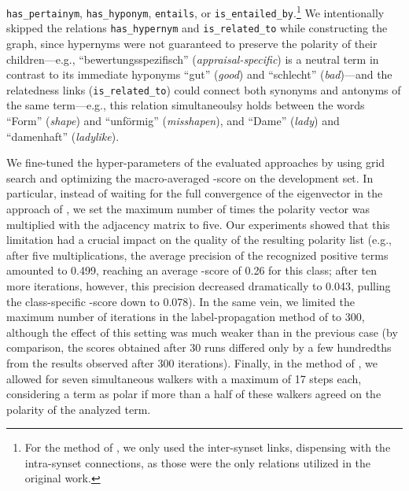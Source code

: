 \texttt{has\_pertainym}, \texttt{has\_hyponym}, \texttt{entails}, or
\texttt{is\_entailed\_by}.\footnote{For the method of
  \citet{Esuli:06c}, we only used the inter-synset links, dispensing
  with the intra-synset connections, as those were the only relations
  utilized in the original work.} We intentionally skipped the
relations \texttt{has\_hypernym} and \texttt{is\_related\_to} while
constructing the graph, since hypernyms were not guaranteed to
preserve the polarity of their children---e.g.,
``bewertungsspezifisch'' (\emph{appraisal-specific}) is a neutral term
in contrast to its immediate hyponyms ``gut'' (\emph{good}) and
``schlecht'' (\emph{bad})---and the relatedness links
(\texttt{is\_related\_to}) could connect both synonyms and antonyms of
the same term---e.g., this relation simultaneoulsy holds between the
words ``Form'' (\emph{shape}) and ``unf\"ormig'' (\emph{misshapen}),
and ``Dame'' (\emph{lady}) and ``damenhaft'' (\emph{ladylike}).

We fine-tuned the hyper-parameters of the evaluated approaches by
using grid search and optimizing the macro-averaged \F{}-score on the
development set.  In particular, instead of waiting for the full
convergence of the eigenvector in the approach of
\citet{Blair-Goldensohn:08}, we set the maximum number of times the
polarity vector was multiplied with the adjacency matrix to five.  Our
experiments showed that this limitation had a crucial impact on the
quality of the resulting polarity list (e.g., after five
multiplications, the average precision of the recognized positive
terms amounted to 0.499, reaching an average \F{}-score of 0.26 for
this class; after ten more iterations, however, this precision
decreased dramatically to 0.043, pulling the class-specific \F{}-score
down to 0.078).  In the same vein, we limited the maximum number of
iterations in the label-propagation method of \citet{Rao:09} to 300,
although the effect of this setting was much weaker than in the
previous case (by comparison, the scores obtained after 30 runs
differed only by a few hundredths from the results observed after 300
iterations).  Finally, in the method of \citet{Awadallah:10}, we
allowed for seven simultaneous walkers with a maximum of 17 steps
each, considering a term as polar if more than a half of these walkers
agreed on the polarity of the analyzed term.

